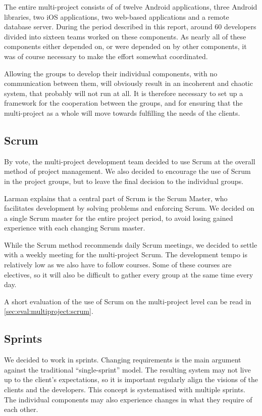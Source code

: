 The entire \giraf multi-project consists of of twelve Android applications, three Android libraries, two iOS applications, two web-based applications and a remote database server.
During the period described in this report, around 60 developers divided into sixteen teams worked on these components. 
As nearly all of these components either depended on, or were depended on by other components, it was of course necessary to make the effort somewhat coordinated. 

Allowing the groups to develop their individual components, with no communication between them, will obviously result in an incoherent and chaotic system, that probably will not run at all. 
It is therefore necessary to set up a framework for the cooperation between the groups, and for ensuring that the multi-project as a whole will move towards fulfilling the needs of the clients.

\subsection{Scrum}\label{sec:collab:multiproject:scrum}
By vote, the multi-project development team decided to use Scrum at the overall method of project management. 
We also decided to encourage the use of Scrum in the project groups, but to leave the final decision to the individual groups. 

Larman \cite{larmanAgile} explains that a central part of Scrum is the Scrum Master, who facilitates development by solving problems and enforcing Scrum. We decided on a single Scrum master for the entire project period, to avoid losing gained experience with each changing Scrum master.

While the Scrum method recommends daily Scrum meetings, we decided to settle with a weekly meeting for the multi-project Scrum. The development tempo is relatively low as we also have to follow courses. Some of these courses are electives, so it will also be difficult to gather every group at the same time every day.

A short evaluation of the use of Scrum on the multi-project level can be read in \cref{sec:eval:multiproject:scrum}.

\subsection{Sprints}
We decided to work in sprints. Changing requirements is the main argument against the traditional ``single-sprint'' model. The resulting system may not live up to the client's expectations, so it is important regularly align the visions of the clients and the developers. This concept is systematised with multiple sprints. The individual components may also experience changes in what they require of each other.

